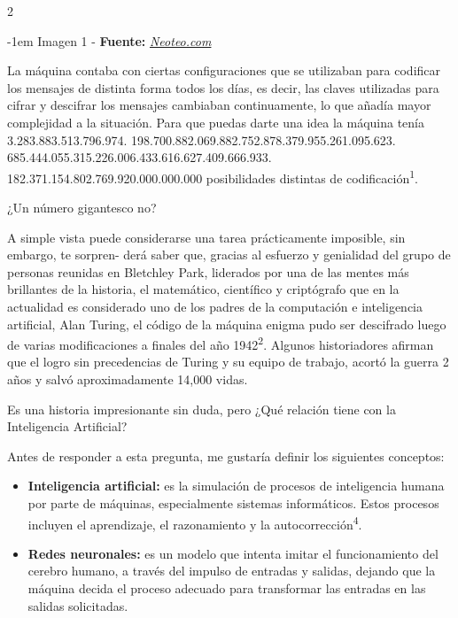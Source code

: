 \documentclass[12pt,spanish,Letterpaper,openany]{book}
\newenvironment{smalltextenv}
  {\begin{center}\kern-1em\color{fondotitulo}\small}%
  {\end{center}}%
\begin{document}
\begin {multicols}{2}
\begin {smalltextenv}
Imagen 1 - \textbf{Fuente:} \emph{\href{https://www.neoteo.com/wp-content/uploads/2008/02/enigma2-758x569.jpg}{Neoteo.com}}

\end {smalltextenv}

La máquina contaba con ciertas configuraciones que se utilizaban para codificar los mensajes de distinta forma todos los días, es decir, las claves utilizadas para cifrar y descifrar los mensajes cambiaban continuamente, lo que añadía mayor complejidad a la situación. Para que puedas darte una idea la máquina tenía 3.283.883.513.796.974.
198.700.882.069.882.752.878.379.955.261.095.623.
685.444.055.315.226.006.433.616.627.409.666.933.
182.371.154.802.769.920.000.000.000 posibilidades distintas de codificación\textsuperscript{1}.

¿Un número gigantesco no?

A simple vista puede considerarse una tarea prácticamente imposible, sin embargo, te sorpren-
derá saber que, gracias al esfuerzo y genialidad del grupo de personas reunidas en Bletchley Park, liderados por una de las mentes más brillantes de la historia, el matemático, científico y criptógrafo que en la actualidad es considerado uno de los padres de la computación e inteligencia artificial, Alan Turing, el código de la máquina enigma pudo ser descifrado luego de varias modificaciones a finales del año 1942\textsuperscript{2}. Algunos historiadores afirman que el logro sin precedencias de Turing y su equipo de trabajo, acortó la guerra 2 años y salvó aproximadamente 14,000 vidas.

Es una historia impresionante sin duda, pero ¿Qué relación tiene con la Inteligencia Artificial?

Antes de responder a esta pregunta, me gustaría definir los siguientes conceptos:

\begin{itemize}
\item
  \textbf{Inteligencia artificial:} es la simulación de procesos de inteligencia humana por parte de máquinas, especialmente sistemas informáticos. Estos procesos incluyen el aprendizaje, el razonamiento y la autocorrección\textsuperscript{4}.
\item
  \textbf{Redes neuronales:} es un modelo que intenta imitar el funcionamiento del cerebro humano, a través del impulso de entradas y salidas, dejando que la máquina decida el proceso adecuado para transformar las entradas en las salidas solicitadas.
\end{itemize}


\end{multicols}
\end{document}
